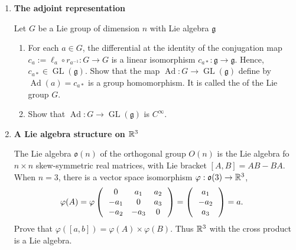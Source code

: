 \documentclass[12pt,a4paper]{report}
\newcommand{\GL}{\operatorname{GL}}
\newcommand{\AD}{\operatorname{Ad}}
\begin{document}
\begin{enumerate}[label=\textbf{16.\arabic*.}]
	\item \textbf{The adjoint representation}
	
	Let $G$ be a Lie group of dimension $n$ with Lie algebra $\mathfrak{g}$
	
	\begin{enumerate}[label=(\alph*)]
	
		\item For each $a \in G$, the differential at the identity of the conjugation map $c_a := \ell_a \circ r_{a^{-1}} : G \to G$ is a linear isomorphism $c_{a*}:\mathfrak{g} \to \mathfrak{g}$.  Hence, $c_{a*} \in \GL(\mathfrak{g})$.  Show that the map $\AD:G\to \GL(\mathfrak{g})$ define by $\AD(a)= c_{a*}$ is a group homomorphism.  It is called the  of the Lie group $G$.
		
		\item Show that $\AD: G \to \GL(\mathfrak{g})$ is $C^\infty$.
	
	\end{enumerate}
	
	\item \textbf{A Lie algebra structure on $\mathbb{R}^3$}
	
	The Lie algebra $\mathfrak{o}(n)$ of the orthogonal group $O(n)$ is the Lie algebra fo $n \times n$ skew-symmetric real matrices, with Lie bracket $[A,B]=AB-BA$.  When $n = 3$, there is a vector space isomorphism $\varphi : \mathfrak{o}(3) \to \mathbb{R}^3$,
	\begin{align*}
		\varphi(A) &= \varphi \left (\,  \begin{array}{c c c} 0&a_1&a_2 \\ -a_1 & 0 & a_3 \\ -a_2 & -a_3 & 0 \end{array}  \,\right ) = \left (\, \begin{array}{c} a_1\\-a_2\\a_3 \end{array}  \,\right ) = a.
	\end{align*}Prove that $\varphi([a,b])=\varphi(A) \times \varphi(B)$.  Thus $\mathbb{R}^3$ with the cross product is a Lie algebra.
	
\end{enumerate}
\end{document}
